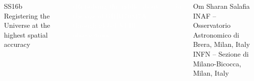 \documentclass[aspectratio=169]{beamer}
\newcommand{\mysession}{SS16b}
\newcommand{\mysessionname}{Registering the Universe at the highest spatial accuracy}
\newcommand{\mytitle}{(Re)solving the riddle about the size of GRB170817A through global VLBI observations}
\newcommand{\myname}{Om Sharan Salafia}
\newcommand{\myinstitutes}{INAF -- Osservatorio Astronomico di Brera, Milan, Italy\\ INFN -- Sezione di Milano-Bicocca, Milan, Italy}
\begin{document}
{\begin{frame}
\begin{columns}[t]
   \centering
   
   \Large\vspace{10pt}\textcolor{EAS_orange}{\mysession}\\
   \normalsize\textcolor{EAS_orange}{\mysessionname}
   
 
 \centering
 
 \Large \textcolor{white}{\mytitle}
 
 \footnotesize \textcolor{white}{by}
 
 \normalsize \textcolor{EAS_orange}{\myname}\\[4pt]
 
 \footnotesize \textcolor{EAS_orange}{\myinstitutes}\\[8pt]


\end{columns}

\end{frame}
\addtocounter{framenumber}{-1}
}


\end{document}
